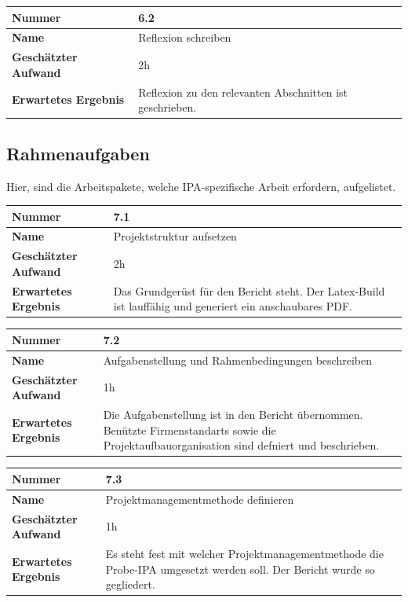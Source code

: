 \begin{longtable}{p{}|p{}}
	\hline
	\textbf{Nummer}    				& 6.2 \\
	\hline
	\textbf{Name}   				& Reflexion schreiben \\
	\hline
	\textbf{Geschätzter Aufwand}	& 2h \\
	\hline
	\textbf{Erwartetes Ergebnis}	& Reflexion zu den relevanten Abschnitten ist geschrieben. \\
	\hline
\end{longtable}

\subsection{Rahmenaufgaben}
Hier, sind die Arbeitspakete, welche IPA-spezifische Arbeit erfordern, aufgelistet.

\begin{longtable}{p{}|p{}}
	\hline
	\textbf{Nummer}    				& 7.1 \\
	\hline
	\textbf{Name}   				& Projektstruktur aufsetzen\\
	\hline
	\textbf{Geschätzter Aufwand}	& 2h \\
	\hline
	\textbf{Erwartetes Ergebnis}	& Das Grundgerüst für den Bericht steht. Der Latex-Build ist lauffähig und generiert ein anschaubares PDF.\\
	\hline
\end{longtable}

\begin{longtable}{p{}|p{}}
	\hline
	\textbf{Nummer}    				& 7.2 \\
	\hline
	\textbf{Name}   				& Aufgabenstellung und Rahmenbedingungen beschreiben\\
	\hline
	\textbf{Geschätzter Aufwand}	& 1h \\
	\hline
	\textbf{Erwartetes Ergebnis}	& Die Aufgabenstellung ist in den Bericht übernommen. Benützte Firmenstandarts sowie die Projektaufbauorganisation sind defniert und beschrieben. \\
	\hline
\end{longtable}

\newpage

\begin{longtable}{p{}|p{}}
	\hline
	\textbf{Nummer}    				& 7.3 \\
	\hline
	\textbf{Name}   				& Projektmanagementmethode definieren\\
	\hline
	\textbf{Geschätzter Aufwand}	& 1h \\
	\hline
	\textbf{Erwartetes Ergebnis}	& Es steht fest mit welcher Projektmanagementmethode die Probe-IPA umgesetzt werden soll. Der Bericht wurde so gegliedert.\\
	\hline
\end{longtable}

